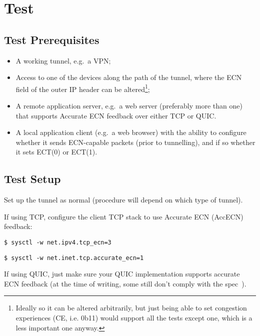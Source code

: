\section{Test}\label{ecn-encap-test_Test}

\subsection{Test Prerequisites}\label{ecn-encap-test_Prereq}

\begin{itemize}[nosep]
	\item A working tunnel, e.g.\ a VPN;
	\item Access to one of the devices along the path of the tunnel, where the ECN field of the outer IP header can be altered\footnote{Ideally so it can be altered arbitrarily, but just being able to set congestion experiences (CE, i.e. 0b11) would support all the tests except one, which is a less important one anyway.};
	\item A remote application server, e.g.\ a web server (preferably more than one) that supports Accurate ECN feedback over either TCP or QUIC.
	\item A local application client (e.g.\ a web browser) with the ability to configure whether it sends ECN-capable packets (prior to tunnelling), and if so whether it sets ECT(0) or ECT(1). 
\end{itemize}
\subsection{Test Setup}\label{ecn-encap-test_Setup}

Set up the tunnel as normal (procedure will depend on which type of tunnel).

If using TCP, configure the client TCP stack to use Accurate ECN (AccECN) feedback: 
\begin{description}[style=nextline, nosep]
	\item[Linux:] \texttt{\$ sysctl -w net.ipv4.tcp\_ecn=3}
	\item[MacOS:] \texttt{\$ sysctl -w net.inet.tcp.accurate\_ecn=1}
\end{description}

If using QUIC, just make sure your QUIC implementation supports accurate ECN feedback (at the time of writing, some still don't comply with the spec~\cite{Iyengar21:QUIC}).

